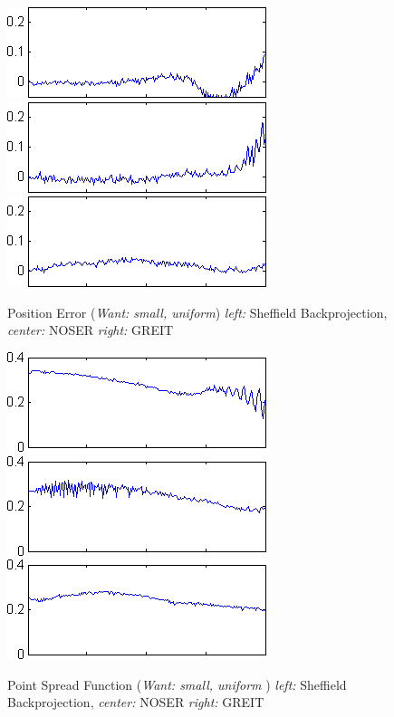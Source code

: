 \documentclass[12pt]{iopart}
\begin{document}
\begin{figure}[bhtp, bb=0 0 280 110]
\begin{center}
  \includegraphics[width= 0.3 \textwidth, bb=0 0 280 110]
{../../tutorial/GREIT-evaluation/simulation_test_imgs/simulation_test04_13.png}
  \includegraphics[width= 0.3 \textwidth, bb=0 0 280 110]
{../../tutorial/GREIT-evaluation/simulation_test_imgs/simulation_test04_23.png}
  \includegraphics[width= 0.3 \textwidth, bb=0 0 280 110]
{../../tutorial/GREIT-evaluation/simulation_test_imgs/simulation_test04_43.png}
\caption{ \label{fig:rimage}
Position Error ({\em Want: small, uniform})
{\em left:} Sheffield Backprojection,
{\em center:} NOSER
{\em right:} GREIT
}
\end{center}
\end{figure}

\begin{figure}[bhtp, bb=0 0 280 110]
\begin{center}
  \includegraphics[width= 0.3 \textwidth, bb=0 0 280 110]
{../../tutorial/GREIT-evaluation/simulation_test_imgs/simulation_test04_14.png}
  \includegraphics[width= 0.3 \textwidth, bb=0 0 280 110]
{../../tutorial/GREIT-evaluation/simulation_test_imgs/simulation_test04_24.png}
  \includegraphics[width= 0.3 \textwidth, bb=0 0 280 110]
{../../tutorial/GREIT-evaluation/simulation_test_imgs/simulation_test04_44.png}
\caption{ \label{fig:rimage}
Point Spread Function ({\em Want: small, uniform })
{\em left:} Sheffield Backprojection,
{\em center:} NOSER
{\em right:} GREIT
}
\end{center}
\end{figure}
\end{document}
